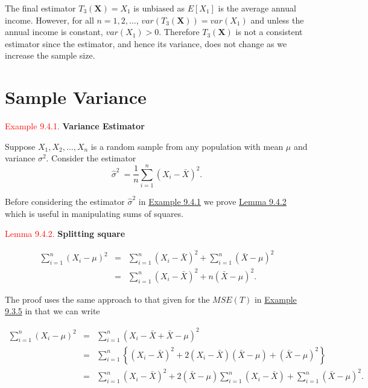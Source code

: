 \documentclass[
]{book}
\begin{document}
The final estimator \(T_3 (\mathbf{X}) =X_1\) is unbiased as \(E[X_1]\) is the average annual income. However, for all \(n =1,2,\ldots\), \(var (T_3 (\mathbf{X})) = var (X_1)\) and unless the annual income is constant, \(var (X_1)>0\). Therefore \(T_3 (\mathbf{X})\) is not a consistent estimator since the estimator, and hence its variance, does not change as we increase the sample size.

\hypertarget{paraestimate:variance}{%
\section{Sample Variance}\label{paraestimate:variance}}

\leavevmode{}%
\textcolor{red}{Example 9.4.1.}
{\textbf{Variance Estimator}}

Suppose \(X_1,X_2,\ldots,X_n\) is a random sample from any population with mean \(\mu\) and variance \(\sigma^2\). Consider the estimator\\

\[ \hat{\sigma}^2\ = \frac{1}{n} \sum\limits_{i=1}^{n} \left( X_i - \bar{X} \right)^2.\]

Before considering the estimator \(\hat{\sigma}^2\) in \protect\hyperlink{paraestimate:ex:variance_estimator_ex}{Example 9.4.1} we prove \protect\hyperlink{paraestimate:lem:square_split}{Lemma 9.4.2} which is useful in manipulating sums of squares.

\leavevmode{}%
\textcolor{red}{Lemma 9.4.2.}
{\textbf{Splitting square}}

\begin{eqnarray*}
\sum\limits_{i=1}^{n} (X_i - \mu)^2 &=& \sum\limits_{i=1}^{n} (X_i - \bar{X})^2 + \sum\limits_{i=1}^{n} (\bar{X} - \mu)^2 \\ &=& \sum\limits_{i=1}^{n} (X_i - \bar{X})^2 + n (\bar{X} - \mu)^2.
\end{eqnarray*}

\hypertarget{paraestimate:lemprf:square_split}{}
The proof uses the same approach to that given for the \(MSE (T)\) in \protect\hyperlink{paraesimate:exer:MSE}{Example 9.3.5} in that we can write

\begin{eqnarray*} \sum\limits_{i=1}^{n} (X_i - \mu)^2 &=& \sum\limits_{i=1}^{n} (X_i - \bar{X} + \bar{X} - \mu)^2  \\
&=& \sum\limits_{i=1}^{n} \left\{ (X_i - \bar{X})^2 + 2 (X_i - \bar{X}) (\bar{X}-\mu) + (\bar{X} - \mu)^2 \right\} \\
&=& \sum\limits_{i=1}^{n}  (X_i - \bar{X})^2 + 2 (\bar{X} - \mu ) \sum\limits_{i=1}^{n} (X_i - \bar{X}) + \sum\limits_{i=1}^{n} (\bar{X} - \mu )^2.
\end{eqnarray*}
\end{document}
